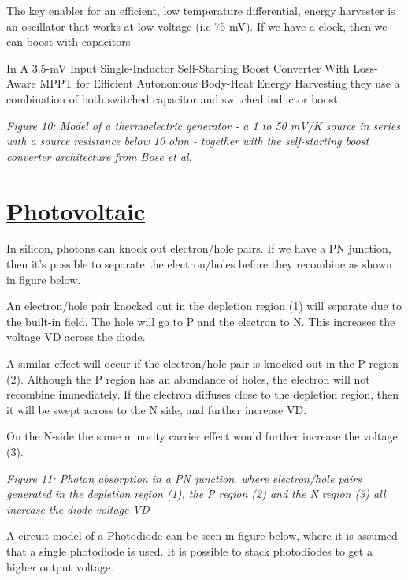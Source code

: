 The key enabler for an efficient, low temperature differential, energy
harvester is an oscillator that works at low voltage (i.e 75 mV). If we
have a clock, then we can boost with capacitors

In A 3.5-mV Input Single-Inductor Self-Starting Boost Converter With
Loss-Aware MPPT for Efficient Autonomous Body-Heat Energy Harvesting
 they use a combination of both switched
capacitor and switched inductor boost.


{
\centering
{}
}

\emph{Figure 10: Model of a thermoelectric generator - a 1 to 50 mV/K
source in series with a source resistance below 10 ohm - together with
the self-starting boost converter architecture from Bose et al.}

\section{\texorpdfstring{\href{https://en.wikipedia.org/wiki/Photovoltaic_effect}{Photovoltaic}}{Photovoltaic}}\label{photovoltaic}

In silicon, photons can knock out electron/hole pairs. If we have a PN
junction, then it's possible to separate the electron/holes before they
recombine as shown in figure below.

An electron/hole pair knocked out in the depletion region (1) will
separate due to the built-in field. The hole will go to P and the
electron to N. This increases the voltage VD across the diode.

A similar effect will occur if the electron/hole pair is knocked out in
the P region (2). Although the P region has an abundance of holes, the
electron will not recombine immediately. If the electron diffuses close
to the depletion region, then it will be swept across to the N side, and
further increase VD.

On the N-side the same minority carrier effect would further increase
the voltage (3).


{
\centering
{}
}

\emph{Figure 11: Photon absorption in a PN junction, where electron/hole
pairs generated in the depletion region (1), the P region (2) and the N
region (3) all increase the diode voltage VD}

A circuit model of a Photodiode can be seen in figure below, where it is
assumed that a single photodiode is used. It is possible to stack
photodiodes to get a higher output voltage.


